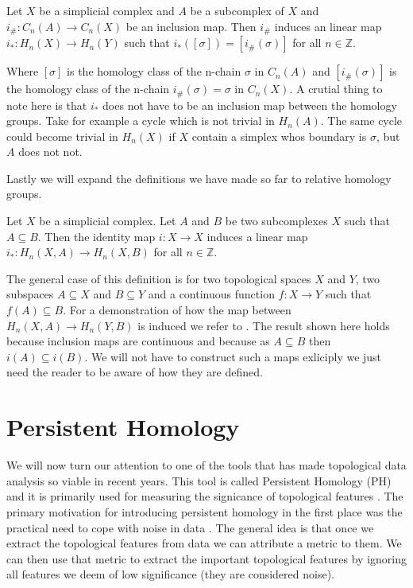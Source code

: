 \begin{defn} Let $X$ be a simplicial complex and $A$ be a subcomplex of $X$ and $i_\#: C_n(A) \to C_n(X)$ be an inclusion map. Then $i_\#$ induces an linear map $i_*: H_n(X) \to H_n(Y)$ such that $i_*([\sigma]) = [i_\#(\sigma)]$ for all $n \in \mathbb{Z}$.
\end{defn}

Where $[\sigma]$ is the homology class of the n-chain $\sigma$ in $C_n(A)$ and $[i_\#(\sigma)]$ is the homology class of the n-chain $i_\#(\sigma) = \sigma$ in $C_n(X)$. A crutial thing to note here is that $i_*$ does not have to be an inclusion map between the homology groups. Take for example a cycle which is not trivial in $H_n(A)$. The same cycle could become trivial in $H_n(X)$ if $X$ contain a simplex whos boundary is $\sigma$, but $A$ does not not.

Lastly we will expand the definitions we have made so far to relative homology groups.

\begin{defn} Let $X$ be a simplicial complex. Let $A$ and $B$ be two subcomplexes $X$ such that $A \subseteq B$. Then the identity map $i: X \to X$ induces a linear map $i_*: H_n(X, A) \to H_n(X, B)$ for all $n \in \mathbb{Z}$.
\label{def:pairs}%
\end{defn}

The general case of this definition is for two topological spaces $X$ and $Y$, two subspaces $A \subseteq X$ and $B \subseteq Y$ and a continuous function $f: X \to Y$ such that $f(A) \subseteq B$. For a demonstration of how the map between $H_n(X, A) \to H_n(Y, B)$ is induced we refer to \cite[p.~118]{algebraic-topology}. The result shown here holds because inclusion maps are continuous and because as  $A \subseteq B$ then $i(A) \subseteq i(B)$. We will not have to construct such a maps exliciply we just need the reader to be aware of how they are defined.


\section{Persistent Homology}

We will now turn our attention to one of the tools that has made topological data analysis so viable in recent years. This tool is called Persistent Homology (PH) and it is primarily used for measuring the signicance of topological features \cite{what-is-ph}. The primary motivation for introducing persistent homology in the first place was the practical need to cope with noise in data \cite{ph-a-survey}. The general idea is that once we extract the topological features from data we can attribute a metric to them. We can then use that metric to extract the important topological features by ignoring all features we deem of low significance (they are considered noise).


